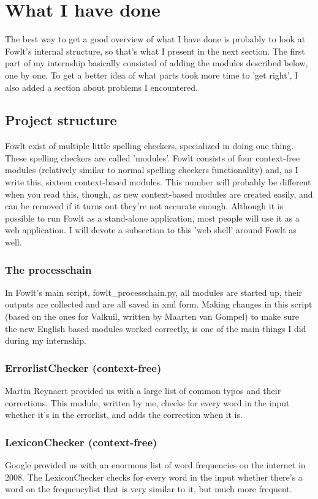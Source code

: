 \documentclass[12pt]{article}
\let\stdsection\section
\renewcommand\section{\newpage\stdsection}
\begin{document}
\section{What I have done}
The best way to get a good overview of what I have done is probably to look at Fowlt's internal structure, so that's what I present in the next section. The first part of my internship basically consisted of adding the modules described below, one by one. To get a better idea of what parts took more time to 'get right', I also added a section about problems I encountered.

\subsection{Project structure}
Fowlt exist of multiple little spelling checkers, specialized in doing one thing. These spelling checkers are called 'modules'. Fowlt consists of four context-free modules (relatively similar to normal spelling checkers functionality) and, as I write this, sixteen context-based modules. This number will probably be different when you read this, though, as new context-based modules are created easily, and can be removed if it turns out they're not accurate enough. Although it is possible to run Fowlt as a stand-alone application, most people will use it as a web application. I will devote a subsection to this 'web shell' around Fowlt as well.


\subsubsection{The processchain}
In Fowlt's main script, fowlt\_processchain.py, all modules are started up, their outputs are collected and are all saved in xml form. Making changes in this script (based on the ones for Valkuil, written by Maarten van Gompel) to make sure the new English based modules worked correctly, is one of the main things I did during my internship. 

\subsubsection{ErrorlistChecker (context-free)}
Martin Reynaert provided us with a large list of common typos and their corrections. This module, written by me, checks for every word in the input whether it's in the errorlist, and adds the correction when it is.

\subsubsection{LexiconChecker (context-free)}
Google provided us with an enormous list of word frequencies on the internet in 2008. The LexiconChecker checks for every word in the input whether there's a word on the frequencylist that is very similar to it, but much more frequent.
\end{document}
